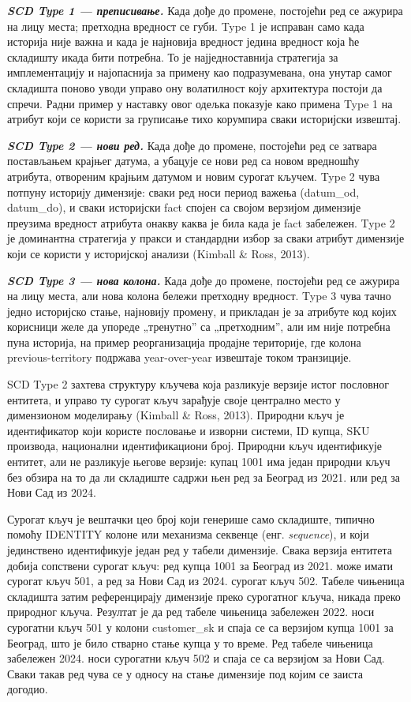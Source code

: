 \textbf{\textit{SCD Type 1 — преписивање.}} Када дође до промене, постојећи ред се ажурира на лицу места; претходна вредност се губи. Type 1 је исправан само када историја није важна и када је најновија вредност једина вредност која ће складишту икада бити потребна. То је најједноставнија стратегија за имплементацију и најопаснија за примену као подразумевана, она унутар самог складишта поново уводи управо ону волатилност коју архитектура постоји да спречи. Радни пример у наставку овог одељка показује како примена Type 1 на атрибут који се користи за груписање тихо корумпира сваки историјски извештај.

\textbf{\textit{SCD Type 2 — нови ред.}} Када дође до промене, постојећи ред се затвара постављањем крајњег датума, а убацује се нови ред са новом вредношћу атрибута, отвореним крајњим датумом и новим сурогат кључем. Type 2 чува потпуну историју димензије: сваки ред носи период важења (datum\_od, datum\_do), и сваки историјски fact спојен са својом верзијом димензије преузима вредност атрибута онакву каква је била када је fact забележен. Type 2 је доминантна стратегија у пракси и стандардни избор за сваки атрибут димензије који се користи у историјској анализи (Kimball \& Ross, 2013).

\textbf{\textit{SCD Type 3 — нова колона.}} Када дође до промене, постојећи ред се ажурира на лицу места, али нова колона бележи претходну вредност. Type 3 чува тачно једно историјско стање, најновију промену, и прикладан је за атрибуте код којих корисници желе да упореде „тренутно” са „претходним”, али им није потребна пуна историја, на пример реорганизација продајне територије, где колона previous-territory подржава year-over-year извештаје током транзиције.

SCD Type 2 захтева структуру кључева која разликује верзије истог пословног ентитета, и управо ту сурогат кључ зарађује своје централно место у димензионом моделирању (Kimball \& Ross, 2013). Природни кључ је идентификатор који користе пословање и изворни системи, ID купца, SKU производа, национални идентификациони број. Природни кључ идентификује ентитет, али не разликује његове верзије: купац 1001 има један природни кључ без обзира на то да ли складиште садржи њен ред за Београд из 2021. или ред за Нови Сад из 2024.

Сурогат кључ је вештачки цео број који генерише само складиште, типично помоћу IDENTITY колоне или механизма секвенце (енг. \textit{sequence}), и који јединствено идентификује један ред у табели димензије. Свака верзија ентитета добија сопствени сурогат кључ: ред купца 1001 за Београд из 2021. може имати сурогат кључ 501, а ред за Нови Сад из 2024. сурогат кључ 502. Табеле чињеница складишта затим референцирају димензије преко сурогатног кључа, никада преко природног кључа. Резултат је да ред табеле чињеница забележен 2022. носи сурогатни кључ 501 у колони customer\_sk и спаја се са верзијом купца 1001 за Београд, што је било стварно стање купца у то време. Ред табеле чињеница забележен 2024. носи сурогатни кључ 502 и спаја се са верзијом за Нови Сад. Сваки такав ред чува се у односу на стање димензије под којим се заиста догодио.

